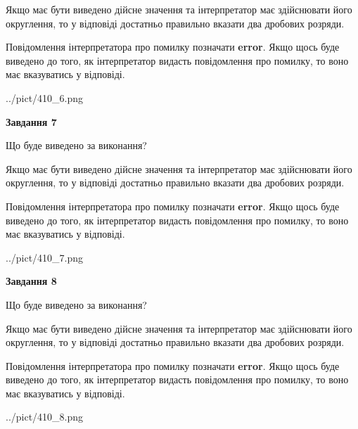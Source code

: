 \documentclass[12pt, ukrainian]{article}
\begin{document}
{\begin {Large}
Якщо має бути виведено дійсне значення та інтерпретатор має здійснювати його округлення, 
то у відповіді достатньо правильно вказати два дробових розряди.

Повідомлення інтерпретатора про помилку позначати \textbf{error}.
Якщо щось буде виведено до того, як інтерпретатор видасть повідомлення про помилку, 
то воно має вказуватись у відповіді. \par

\begin{center}
	{../pict/410_6.png}
\end{center}
\newpage

{\begin {center}\textbf{Завдання 7}\end {center}}\par
Що буде виведено за виконання? \par

Якщо має бути виведено дійсне значення та інтерпретатор має здійснювати його округлення, 
то у відповіді достатньо правильно вказати два дробових розряди.

Повідомлення інтерпретатора про помилку позначати \textbf{error}.
Якщо щось буде виведено до того, як інтерпретатор видасть повідомлення про помилку, 
то воно має вказуватись у відповіді. \par

\begin{center}
	{../pict/410_7.png}
\end{center}
\newpage

{\begin {center}\textbf{Завдання 8}\end {center}}\par
Що буде виведено за виконання? \par

Якщо має бути виведено дійсне значення та інтерпретатор має здійснювати його округлення, 
то у відповіді достатньо правильно вказати два дробових розряди.

Повідомлення інтерпретатора про помилку позначати \textbf{error}.
Якщо щось буде виведено до того, як інтерпретатор видасть повідомлення про помилку, 
то воно має вказуватись у відповіді. \par

\begin{center}
	{../pict/410_8.png}
\end{center}
\newpage


\end{Large}}
\end{document}
